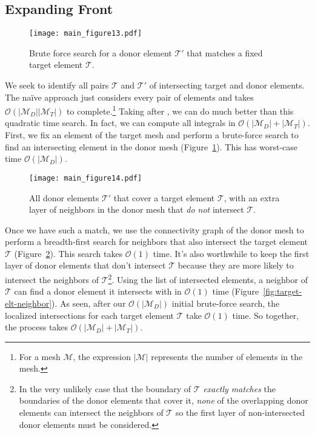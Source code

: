 \documentclass[oneside, reqno]{amsart}
\theoremstyle{definition}
\newcommand{\bigO}[1]{\mathcal{O}\left(#1\right)}
\begin{document}
\subsection{Expanding Front}\label{subsec:expanding-front}

\begin{figure}
  \texttt{[image: main\_figure13.pdf]}
  \centering
  \captionsetup{width=.75\linewidth}
  \caption{Brute force search for a donor element \(\mathcal{T}'\) that matches
    a fixed target element \(\mathcal{T}\).}
  \label{fig:target-elt-brute-force}
\end{figure}

We seek to identify all pairs \(\mathcal{T}\) and \(\mathcal{T}'\) of
intersecting target and donor elements. The na\"{i}ve approach just
considers every pair
of elements and takes \(\bigO{\left|\mathcal{M}_D\right|
\left|\mathcal{M}_T\right|}\) to complete.\footnote{For a mesh \(\mathcal{M}\),
the expression \(\left|\mathcal{M}\right|\) represents the number of elements
in the mesh.} Taking after \cite{Farrell2011}, we can do much better than this
quadratic time search. In fact, we can compute all integrals in
\(\bigO{\left|\mathcal{M}_D\right| + \left|\mathcal{M}_T\right|}\).
First, we fix an element of the target mesh and perform a brute-force search
to find an intersecting element in the donor mesh
(Figure~\ref{fig:target-elt-brute-force}). This has worst-case time
\(\bigO{\left|\mathcal{M}_D\right|}\).

\begin{figure}
  \texttt{[image: main\_figure14.pdf]}
  \centering
  \captionsetup{width=.75\linewidth}
  \caption{All donor elements \(\mathcal{T}'\) that cover a target element
    \(\mathcal{T}\), with an extra layer of neighbors in the donor mesh
    that \emph{do not} intersect \(\mathcal{T}\).}
  \label{fig:target-elt-overlap-extra-layer}
\end{figure}

Once we have such a match, we use the connectivity graph of the
donor mesh to perform a breadth-first search
for neighbors that also intersect the target
element \(\mathcal{T}\) (Figure~\ref{fig:target-elt-overlap-extra-layer}).
This search takes \(\bigO{1}\) time. It's also worthwhile to keep the first
layer of donor elements that don't intersect \(\mathcal{T}\) because they are
more likely to intersect the neighbors of \(\mathcal{T}\)\footnote{In the
very unlikely case that the boundary of \(\mathcal{T}\)
\emph{exactly matches} the boundaries of the donor elements that cover it,
\emph{none} of the overlapping donor elements can intersect the neighbors of
\(\mathcal{T}\) so the first layer of non-intersected donor
elements must be considered.}. Using the list of intersected elements, a
neighbor of \(\mathcal{T}\) can find a donor element it intersects with in
\(\bigO{1}\) time (Figure~\ref{fig:target-elt-neighbor}).
As seen, after our \(\bigO{\left|\mathcal{M}_D\right|}\)
initial brute-force search, the localized intersections for each
target element \(\mathcal{T}\) take
\(\bigO{1}\) time. So together, the process takes
\(\bigO{\left|\mathcal{M}_D\right| + \left|\mathcal{M}_T\right|}\).
\end{document}
